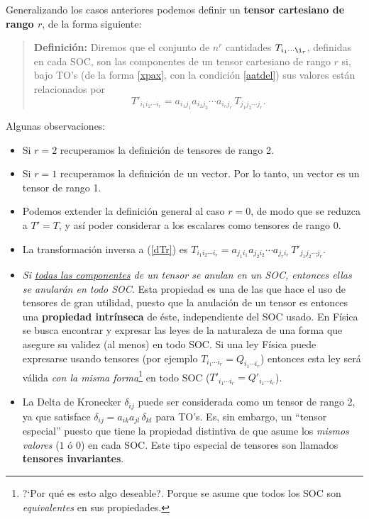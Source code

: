 Generalizando los casos anteriores podemos definir un \textbf{tensor cartesiano de rango $r$}, de la forma siguiente:
\begin{quotation}
\textbf{Definición:} Diremos que el conjunto de $n^r$ cantidades $T_{i_1\cdots\i_r}$, definidas en cada SOC, son las componentes de un tensor cartesiano de rango $r$ si, bajo TO's (de la forma \eqref{xpax}, con la condición \eqref{aatdel}) sus valores están relacionados por 
\begin{equation}\label{dTr}
\boxed{T'_{i_1i_2\cdots i_r}=a_{i_1j_1}a_{i_2j_2}\cdots a_{i_rj_r}\,T_{j_1j_2\cdots j_r}.}
\end{equation}
\end{quotation}
Algunas observaciones:
\begin{itemize}
\item Si $r=2$ recuperamos la definición de tensores de rango 2. 
\item Si $r=1$ recuperamos la definición de un vector. Por lo tanto, un vector es un tensor de rango 1.
\item Podemos extender la definición general al caso $r=0$, de modo que se reduzca a $T'=T$, y así poder considerar a los escalares como tensores de rango $0$.
\item La transformación inversa a (\ref{dTr}) es $T_{i_1i_2\cdots i_r}=a_{j_1i_1}a_{j_2i_2}\cdots a_{j_ri_r}\,T'_{j_1j_2\cdots j_r}$.
\item \textit{Si \underline{todas las componentes} de un tensor se anulan en un SOC, entonces ellas se anularán \textit{en todo SOC}}. Esta propiedad es una de las que hace el uso de tensores de gran utilidad, puesto que la anulación de un tensor es entonces una \textbf{propiedad intrínseca} de éste, independiente del SOC usado. En Física se busca encontrar y expresar las leyes de la naturaleza de una forma que asegure su validez (al menos) en todo SOC. Si una ley Física puede expresarse usando tensores (por ejemplo $T_{i_1\cdots i_r}=Q_{i_1\cdots i_r}$) entonces esta ley será válida \textit{con la misma forma}\footnote{?`Por qué es esto algo deseable?. Porque se asume que todos los SOC son \textit{equivalentes} en sus propiedades.} en todo SOC ($T'_{i_1\cdots i_r}=Q'_{i_1\cdots i_r}$).
\item La Delta de Kronecker $\delta_{ij}$ puede ser considerada como un tensor de rango 2, ya que satisface $\delta_{ij}=a_{ik}a_{jl}\,\delta_{kl}$ para TO's. Es, sin embargo, un ``tensor especial'' puesto que tiene la propiedad distintiva de que asume los \textit{mismos valores} ($1$ ó $0$) en cada SOC. Este tipo especial de tensores son llamados \textbf{tensores invariantes}.
\end{itemize}

